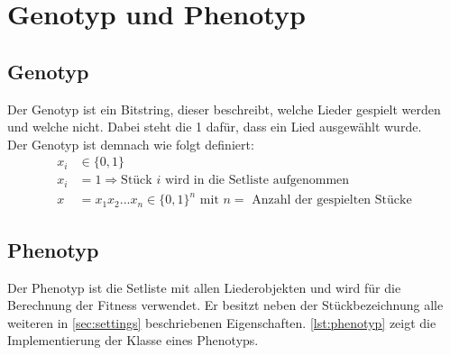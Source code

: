 \section{Genotyp und Phenotyp}\label{sec:genotypPhenotyp}
\subsection{Genotyp}
Der Genotyp ist ein Bitstring, dieser beschreibt, welche Lieder gespielt werden und welche nicht.
Dabei steht die 1 dafür, dass ein Lied ausgewählt wurde. \\
Der Genotyp ist demnach wie folgt definiert: 
\begin{equation}
    \label{eqn:genotyp}
    \begin{split}
        x_i &\in \{ 0,1 \} \\
        x_i &= 1 \Rightarrow \text{Stück $i$ wird in die Setliste aufgenommen} \\
        x   &= x_1x_2...x_n \in \{0,1\}^n\text{ mit $n = $ Anzahl der gespielten Stücke}
    \end{split}
\end{equation}

\subsection{Phenotyp}
Der Phenotyp ist die Setliste mit allen Liederobjekten und wird für die
Berechnung der Fitness verwendet.
Er besitzt neben der Stückbezeichnung alle weiteren in \autoref{sec:settings}
beschriebenen Eigenschaften. \autoref{lst:phenotyp} zeigt die Implementierung der Klasse
eines Phenotyps.


